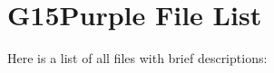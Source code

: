 \section{G15Purple File List}
Here is a list of all files with brief descriptions:\begin{CompactList}
\item{}
\item{}
\end{CompactList}
